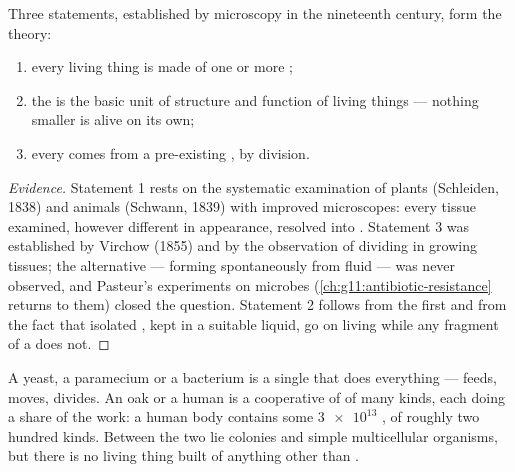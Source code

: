 \begin{proposition}\label{prop:g10:cells-common-unit:theory}
Three statements, established by microscopy in the nineteenth century,
form the  theory:
\begin{enumerate}
  \item every living thing is made of one or more ;
  \item the  is the basic unit of structure and function of living
        things --- nothing smaller is alive on its own;
  \item every  comes from a pre-existing , by division.
\end{enumerate}
\end{proposition}
\begin{proof}[Evidence]
Statement 1 rests on the systematic examination of plants (Schleiden,
1838) and animals (Schwann, 1839) with improved microscopes: every
tissue examined, however different in appearance, resolved into .
Statement 3 was established by Virchow (1855) and by the observation of
dividing  in growing tissues; the alternative ---  forming
spontaneously from fluid --- was never observed, and Pasteur's
experiments on microbes (\cref{ch:g11:antibiotic-resistance} returns to
them) closed the question. Statement 2 follows from the first and from
the fact that isolated , kept in a suitable liquid, go on living
while any fragment of a  does not.
\end{proof}

\begin{example}\label{ex:g10:cells-common-unit:onemany}
A yeast, a paramecium or a bacterium is a single  that does
everything --- feeds, moves, divides. An oak or a human is a
cooperative of  of many kinds, each doing a share of the work: a
human body contains some $\num{3e13}$ , of roughly two hundred
kinds. Between the two lie colonies and simple multicellular
organisms, but there is no living thing built of anything other than
.
\end{example}

